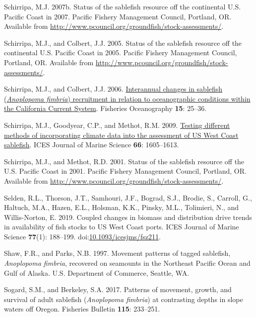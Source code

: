 \documentclass[
  english,
]{article}
\newlength{\cslhangindent}
\newenvironment{CSLReferences}[2] %
 {\begin{list}{}{%
  \setlength{\itemindent}{0pt}
  \setlength{\leftmargin}{0pt}
  \setlength{\parsep}{0pt}
  \ifodd #1
   \setlength{\leftmargin}{\cslhangindent}
   \setlength{\itemindent}{-1\cslhangindent}
  \fi
  \setlength{\itemsep}{#2\baselineskip}}}
 {\end{list}}
\begin{document}
\begin{CSLReferences}{1}{0}
Schirripa, M.J. 2007b. Status of the {s}ablefish resource off the
continental {U}.{S}. {P}acific {C}oast in 2007. Pacific Fishery
Management Council, Portland, OR. Available from
\url{http://www.pcouncil.org/groundfish/stock-assessments/}.

Schirripa, M.J., and Colbert, J.J. 2005. Status of the {s}ablefish
resource off the continental {U}.{S}. {P}acific {C}oast in 2005. Pacific
Fishery Management Council, Portland, OR. Available from
\url{http://www.pcouncil.org/groundfish/stock-assessments/}.

Schirripa, M.J., and Colbert, J.J. 2006. \href{}{Interannual changes in
sablefish (\emph{{A}noplopoma fimbria}) recruitment in relation to
oceanographic conditions within the {C}alifornia {C}urrent {S}ystem}.
Fisheries Oceanography \textbf{15}: 25--36.

Schirripa, M.J., Goodyear, C.P., and Methot, R.M. 2009. \href{}{Testing
different methods of incorporating climate data into the assessment of
{U}{S} {W}est {C}oast sablefish}. {ICES} Journal of Marine Science
\textbf{66}: 1605--1613.

Schirripa, M.J., and Methot, R.D. 2001. Status of the sablefish resource
off the {U}.{S}. {P}acific {C}oast in 2001. Pacific Fishery Management
Council, Portland, OR. Available from
\url{http://www.pcouncil.org/groundfish/stock-assessments/}.

Selden, R.L., Thorson, J.T., Samhouri, J.F., Bograd, S.J., Brodie, S.,
Carroll, G., Haltuch, M.A., Hazen, E.L., Holsman, K.K., Pinsky, M.L.,
Tolimieri, N., and Willis-Norton, E. 2019. Coupled changes in biomass
and distribution drive trends in availability of fish stocks to {US West
Coast} ports. {ICES} Journal of Marine Science \textbf{77}(1): 188--199.
doi:\href{https://doi.org/10.1093/icesjms/fsz211}{10.1093/icesjms/fsz211}.

Shaw, F.R., and Parks, N.B. 1997. Movement patterns of tagged sablefish,
\emph{{A}noplopoma fimbria}, recovered on seamounts in the {N}ortheast
{P}acific {O}cean and {G}ulf of {A}laska. {U}.{S}. Department of
Commerce, Seattle, WA.

Sogard, S.M., and Berkeley, S.A. 2017. Patterns of movement, growth, and
survival of adult sablefish (\emph{{A}noplopoma fimbria}) at contrasting
depths in slope waters off {O}regon. Fisheries Bulletin \textbf{115}:
233--251.


\end{CSLReferences}
\end{document}
